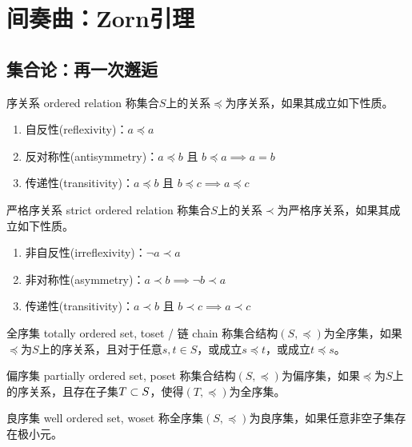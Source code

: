 \section{间奏曲：Zorn引理}

\subsection{集合论：再一次邂逅}

\begin{definition}{序关系 ordered relation}
	称集合$S$上的关系$\preceq$为序关系，如果其成立如下性质。
	\begin{enumerate}
		\item 自反性(reflexivity)：$a\preceq a$
		\item 反对称性(antisymmetry)：$a\preceq b\text{ 且 }b\preceq a\implies a=b$
		\item 传递性(transitivity)：$a\preceq b\text{ 且 }b\preceq c\implies a\preceq c$
	\end{enumerate}
\end{definition}

\begin{definition}{严格序关系 strict ordered relation}
	称集合$S$上的关系$\prec$为严格序关系，如果其成立如下性质。
	\begin{enumerate}
		\item 非自反性(irreflexivity)：$\neg a\prec a$
		\item 非对称性(asymmetry)：$a\prec b\implies \neg b\prec a$
		\item 传递性(transitivity)：$a\prec b\text{ 且 }b\prec c\implies a\prec c$
	\end{enumerate}
\end{definition}

\begin{definition}{全序集 totally ordered set, toset / 链 chain}
	称集合结构$(S,\preceq)$为全序集，如果$\preceq$为$S$上的序关系，且对于任意$s,t\in S$，或成立$s\preceq t$，或成立$t\preceq s$。
\end{definition}

\begin{definition}{偏序集 partially ordered set, poset}
	称集合结构$(S,\preceq)$为偏序集，如果$\preceq$为$S$上的序关系，且存在子集$T\subset S$，使得$(T,\preceq)$为全序集。
\end{definition}

\begin{definition}{良序集 well ordered set, woset}
	称全序集$(S,\preceq)$为良序集，如果任意非空子集存在极小元。
\end{definition}

